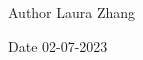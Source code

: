 \begin{DoxyAuthor}{Author}
Laura Zhang 
\end{DoxyAuthor}
\begin{DoxyDate}{Date}
02-\/07-\/2023 
\end{DoxyDate}
